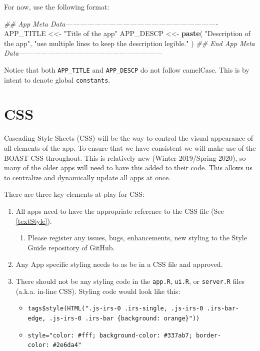 \documentclass[]{book}
\newenvironment{Shaded}{\begin{snugshade}}{\end{snugshade}}
\newcommand{\CommentTok}[1]{\textcolor[rgb]{0.56,0.35,0.01}{\textit{#1}}}
\newcommand{\KeywordTok}[1]{\textcolor[rgb]{0.13,0.29,0.53}{\textbf{#1}}}
\newcommand{\NormalTok}[1]{#1}
\newcommand{\StringTok}[1]{\textcolor[rgb]{0.31,0.60,0.02}{#1}}
\providecommand{\tightlist}{%
  \setlength{\itemsep}{0pt}\setlength{\parskip}{0pt}}
\begin{document}
For now, use the following format:

\begin{Shaded}
\begin{Highlighting}[]
\CommentTok{## App Meta Data----------------------------------------------------------------}
\NormalTok{APP_TITLE  <<-}\StringTok{ "Title of the app"}
\NormalTok{APP_DESCP  <<-}\StringTok{ }\KeywordTok{paste}\NormalTok{(}
  \StringTok{"Description of the app"}\NormalTok{,}
  \StringTok{"use multiple lines to keep the description legible."}
\NormalTok{)}
\CommentTok{## End App Meta Data------------------------------------------------------------}
\end{Highlighting}
\end{Shaded}

Notice that both \texttt{APP\_TITLE} and \texttt{APP\_DESCP} do not follow camelCase. This is by intent to denote global \texttt{constants}.

\hypertarget{css}{%
\section{CSS}\label{css}}

Cascading Style Sheets (CSS) will be the way to control the visual appearance of all elements of the app. To ensure that we have consistent we will make use of the BOAST CSS throughout. This is relatively new (Winter 2019/Spring 2020), so many of the older apps will need to have this added to their code. This allows us to centralize and dynamically update all apps at once.

There are three key elements at play for CSS:

\begin{enumerate}
\def\labelenumi{\arabic{enumi}.}
\tightlist
\item
  All apps need to have the appropriate reference to the CSS file (See \ref{textStyle}).

  \begin{enumerate}
  \def\labelenumii{\alph{enumii}.}
  \tightlist
  \item
    Please register any issues, bugs, enhancements, new styling to the Style Guide repository of GitHub.
  \end{enumerate}
\item
  Any App specific styling needs to as be in a CSS file and approved.
\item
  There should not be any styling code in the \texttt{app.R}, \texttt{ui.R}, or \texttt{server.R} files (a.k.a. in-line CSS). Styling code would look like this:

  \begin{itemize}
  \tightlist
  \item
    \texttt{tags\$style(HTML(".js-irs-0\ .irs-single,\ .js-irs-0\ .irs-bar-edge,\ .js-irs-0\ .irs-bar\ \{background:\ orange\}"))}~\\
  \item
    \texttt{style="color:\ \#fff;\ background-color:\ \#337ab7;\ border-color:\ \#2e6da4"}
  \end{itemize}
\end{enumerate}
\end{document}

